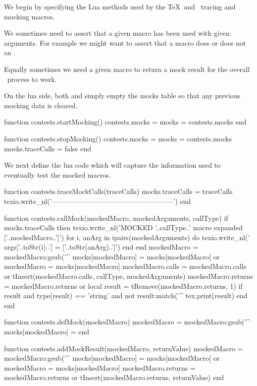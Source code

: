 
We begin by specifying the Lua methods used by the \TeX\ and \ConTeXt\ 
tracing and mocking macros. 

We sometimes need to assert that a given macro has been used with given 
arguments. For example we might want to assert that a macro does or does 
not \quote{throw} an \type{\errmessage}.

Equally sometimes we need a given 
macro to return a mock result for the overall \ConTeXt\ process to work. 

On the lua side, both  and  simply 
empty the mocks table so that any previous mocking data is cleared. 

\startLuaCode
function contests.startMocking()
  contests.mocks = { }
  mocks          = contests.mocks
end

function contests.stopMocking()
  contests.mocks   = { }
  mocks            = contests.mocks
  mocks.traceCalls = false
end
\stopLuaCode

We next define the lua code which will capture the information used to 
eventually test the mocked macros. 

\startLuaCode
function contests.traceMockCalls(traceCalls)
  mocks.traceCalls = traceCalls
  texio.write_nl('-----------------------------------------------------')
end

function contests.callMock(mockedMacro, mockedArguments, callType)
  if mocks.traceCalls then
    texio.write_nl('MOCKED '..callType..' macro expanded ['..mockedMacro..']')
    for i, anArg in ipairs(mockedArguments) do
      texio.write_nl('  args['..toStr(i)..'] = ['..toStr(anArg)..']')
    end
  end
  mockedMacro = mockedMacro:gsub('^%
  mocks[mockedMacro] = mocks[mockedMacro] or { }
  mockedMacro = mocks[mockedMacro]
  mockedMacro.calls = mockedMacro.calls or { }
  tInsert(mockedMacro.calls, { callType, mockedArguments})
  mockedMacro.returns = mockedMacro.returns or { }
  local result = tRemove(mockedMacro.returns, 1)
  if result and type(result) == 'string' and not result:match('^%
    tex.print(result)
  end
end
\stopLuaCode

\startLuaCode
function contests.defMock(mockedMacro)
  mockedMacro = mockedMacro:gsub('^%
  mocks[mockedMacro] = { }
end

function contests.addMockResult(mockedMacro, returnValue)
  mockedMacro = mockedMacro:gsub('^%
  mocks[mockedMacro] = mocks[mockedMacro] or { }
  mockedMacro = mocks[mockedMacro]
  mockedMacro.returns = mockedMacro.returns or { }
  tInsert(mockedMacro.returns, returnValue)
end
\stopLuaCode

